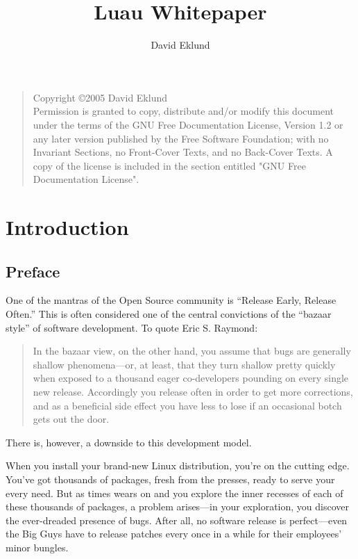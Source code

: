 \documentclass{report}
\author{David Eklund}
\begin{document}
\title{Luau Whitepaper}

\maketitle

\begin{quote}
    Copyright \copyright  2005  David Eklund\\	
    Permission is granted to copy, distribute and/or modify this document
    under the terms of the GNU Free Documentation License, Version 1.2
    or any later version published by the Free Software Foundation;
    with no Invariant Sections, no Front-Cover Texts, and no Back-Cover Texts.
    A copy of the license is included in the section entitled "GNU
    Free Documentation License".
\end{quote}

\newpage


\tableofcontents

\newpage

\chapter{Introduction}

\section{Preface}

One of the mantras of the Open Source community is ``Release Early, Release
Often.''  This is often considered one of the central convictions of the 
``bazaar style'' of software development.  To quote Eric S. Raymond:
\begin{quote}
In the bazaar view, on the other hand, you assume that bugs are generally
shallow phenomena---or, at least, that they turn shallow pretty quickly when
exposed to a thousand eager co-developers pounding on every single new release.
Accordingly you release often in order to get more corrections, and as a
beneficial side effect you have less to lose if an occasional botch gets out
the door.
\end{quote}
There is, however, a downside to this development model.

When you install your brand-new Linux distribution, you're on the cutting edge.
You've got thousands of packages, fresh from the presses, ready to serve your
every need.  But as times wears on and you explore the inner recesses of each
of these thousands of packages, a problem arises---in your exploration, you
discover the ever-dreaded presence of bugs.  After all, no software release
is perfect---even the Big Guys have to release patches every once in a while
for their employees' minor bungles.
\end{document}

